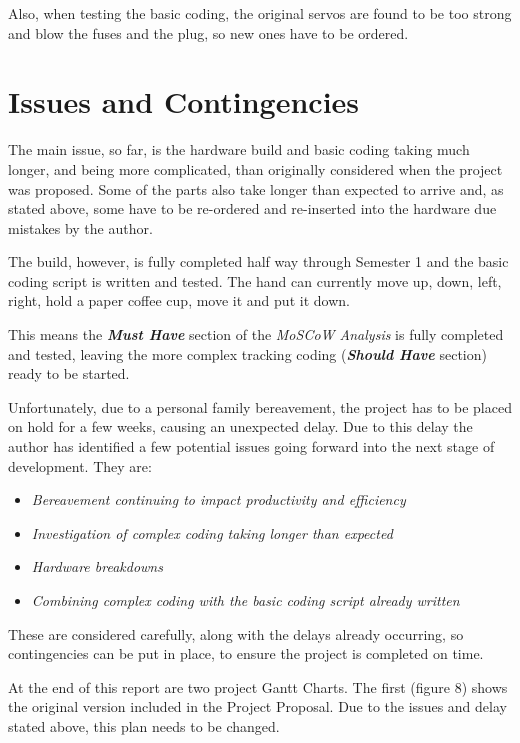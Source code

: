 \documentclass[progress]{cmpreport}
\begin{document}
Also, when testing the basic coding, the original servos are found to be too strong and blow the fuses and the plug, so new ones have to be ordered. 

\section{Issues and Contingencies}
The main issue, so far, is the hardware build and basic coding taking much longer, and being more complicated, than originally considered when the project was proposed. Some of the parts also take longer than expected to arrive and, as stated above, some have to be re-ordered and re-inserted into the hardware due mistakes by the author. 

The build, however, is fully completed half way through Semester 1 and the basic coding script is written and tested. The hand can currently move up, down, left, right, hold a paper coffee cup, move it and put it down. 

This means the \textbf{\textit{Must Have}} section of the \textit{MoSCoW Analysis} is fully completed and tested, leaving the more complex tracking coding  (\textbf{\textit{Should Have}} section) ready to be started. 

Unfortunately, due to a personal family bereavement, the project has to be placed on hold for a few weeks, causing an unexpected delay. Due to this delay the author has identified a few potential issues going forward into the next stage of development. They are:

\begin{itemize}		
	\item \textit{Bereavement continuing to impact productivity and efficiency}
	\item \textit{Investigation of complex coding taking longer than expected}
	\item \textit{Hardware breakdowns}
	\item \textit{Combining complex coding with the basic coding script already written}
\end{itemize}

These are considered carefully, along with the delays already occurring, so contingencies can be put in place, to ensure the project  is completed on time. 

At the end of this report are two project Gantt Charts. The first (figure 8) shows the original version included in the Project Proposal. Due to the issues and delay stated above, this plan needs to be changed. 
\end{document}
